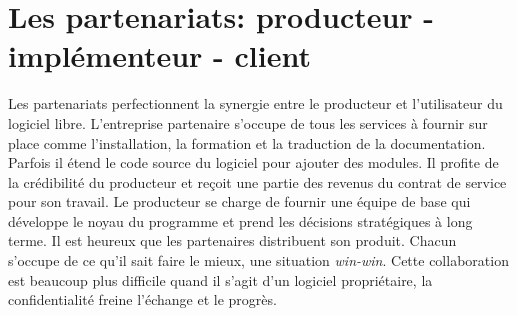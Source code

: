 \section*{Les partenariats: producteur - implémenteur - client} %
Les partenariats perfectionnent la synergie entre le producteur et l'utilisateur du logiciel
libre. L'entreprise partenaire s'occupe de tous les services à fournir sur place comme l'installation, la formation et
la traduction de la documentation. Parfois il étend le code source du logiciel pour ajouter des modules. 
Il profite de la crédibilité du producteur et reçoit une partie des revenus du contrat de service pour son travail.
Le producteur se charge de fournir une équipe de base qui développe le noyau du programme et 
prend les décisions stratégiques à long terme. Il est heureux que les partenaires
distribuent son produit. Chacun s'occupe de ce qu'il sait %
faire le mieux, une situation \textit{win-win}.
Cette collaboration est beaucoup plus difficile
quand il s'agit d'un logiciel propriétaire, la confidentialité freine l'échange et le progrès.

	
		
